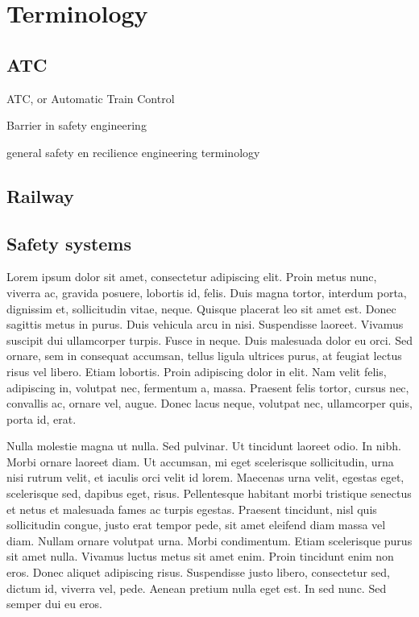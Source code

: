 


\chapter{Terminology}
\section{ATC}
ATC, or Automatic Train Control

Barrier in safety engineering

general safety en recilience engineering terminology

\section{Railway}

\section{Safety systems}
Lorem ipsum dolor sit amet, consectetur adipiscing elit. Proin metus nunc, viverra ac, gravida 
posuere, lobortis id, felis. Duis magna tortor, interdum porta, dignissim et, sollicitudin vitae, 
neque. Quisque placerat leo sit amet est. Donec sagittis metus in purus. Duis vehicula arcu in 
nisi. Suspendisse laoreet. Vivamus suscipit dui ullamcorper turpis. Fusce in neque. Duis malesuada 
dolor eu orci. Sed ornare, sem in consequat accumsan, tellus ligula ultrices purus, at feugiat 
lectus risus vel libero. Etiam lobortis. Proin adipiscing dolor in elit. Nam velit felis, 
adipiscing in, volutpat nec, fermentum a, massa. Praesent felis tortor, cursus nec, convallis ac, 
ornare vel, augue. Donec lacus neque, volutpat nec, ullamcorper quis, porta id, erat.

Nulla molestie magna ut nulla. Sed pulvinar. Ut tincidunt laoreet odio. In nibh. Morbi ornare laoreet diam. Ut accumsan, mi eget scelerisque sollicitudin, urna nisi rutrum velit, et iaculis orci velit id lorem. Maecenas urna velit, egestas eget, scelerisque sed, dapibus eget, risus. Pellentesque habitant morbi tristique senectus et netus et malesuada fames ac turpis egestas. Praesent tincidunt, nisl quis sollicitudin congue, justo erat tempor pede, sit amet eleifend diam massa vel diam. Nullam ornare volutpat urna. Morbi condimentum. Etiam scelerisque purus sit amet nulla. Vivamus luctus metus sit amet enim. Proin tincidunt enim non eros. Donec aliquet adipiscing risus. Suspendisse justo libero, consectetur sed, dictum id, viverra vel, pede. Aenean pretium nulla eget est. In sed nunc. Sed semper dui eu eros.

